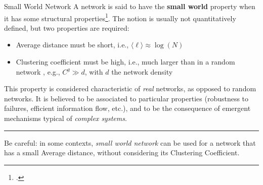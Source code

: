 \documentclass[a4paper,11pt]{book}
\begin{document}
\begin{textbox}{Small World Network}
A network is said to have the \textbf{small world} property when it has some structural properties\footcite{watts1998collective}. The notion is usually not quantitatively defined, but two properties are required:
\begin{itemize}
    \item Average distance must be short, i.e., $\langle\ell\rangle \approx \log(N)$
    \item Clustering coefficient must be high, i.e., much larger than in a random network , e.g., $C^g \gg d$, with $d$ the network density
\end{itemize}

This property is considered characteristic of \textit{real} networks, as opposed to random networks. It is believed to be associated to particular properties (robustness to failures, efficient information flow, etc.), and to be the consequence of emergent mechanisms typical of \textit{complex systems}.

\noindent\rule{4cm}{0.1pt}

Be careful: in some contexts, \textit{small world network} can be used for a network that has a small Average distance, without considering its Clustering Coefficient.
\end{textbox}
\end{document}
